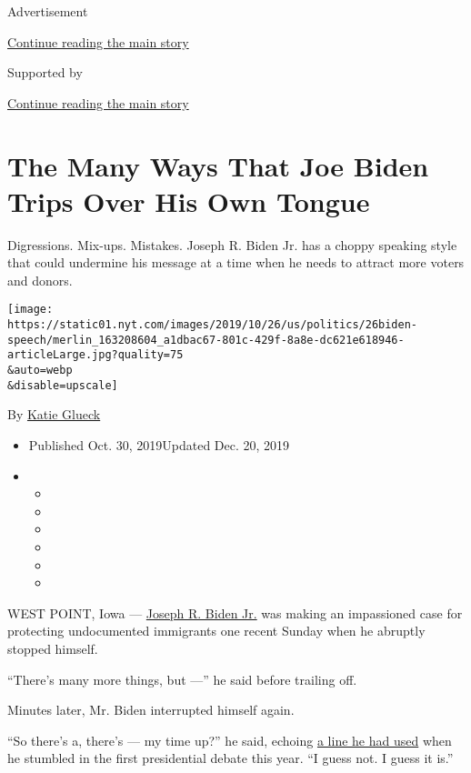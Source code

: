Advertisement

\protect\hyperlink{after-top}{Continue reading the main story}

Supported by

\protect\hyperlink{after-sponsor}{Continue reading the main story}

\hypertarget{the-many-ways-that-joe-biden-trips-over-his-own-tongue}{%
\section{The Many Ways That Joe Biden Trips Over His Own
Tongue}\label{the-many-ways-that-joe-biden-trips-over-his-own-tongue}}

Digressions. Mix-ups. Mistakes. Joseph R. Biden Jr. has a choppy
speaking style that could undermine his message at a time when he needs
to attract more voters and donors.

\texttt{[image: https://static01.nyt.com/images/2019/10/26/us/politics/26biden-speech/merlin\_163208604\_a1dbac67-801c-429f-8a8e-dc621e618946-articleLarge.jpg?quality=75\\\&auto=webp\\\&disable=upscale]}

By \href{https://www.nytimes.com/by/katie-glueck}{Katie Glueck}

\begin{itemize}
\item
  Published Oct. 30, 2019Updated Dec. 20, 2019
\item
  \begin{itemize}
  \item
  \item
  \item
  \item
  \item
  \item
  \end{itemize}
\end{itemize}

WEST POINT, Iowa ---
\href{https://www.nytimes.com/2019/12/20/podcasts/the-daily/joe-biden-2020.html}{Joseph
R. Biden Jr.} was making an impassioned case for protecting undocumented
immigrants one recent Sunday when he abruptly stopped himself.

``There's many more things, but ---'' he said before trailing off.

Minutes later, Mr. Biden interrupted himself again.

``So there's a, there's --- my time up?'' he said, echoing
\href{https://www.nytimes.com/2019/06/27/us/politics/kamala-harris-joe-biden-busing.html?module=inline}{a
line he had used} when he stumbled in the first presidential debate this
year. ``I guess not. I guess it is.''


